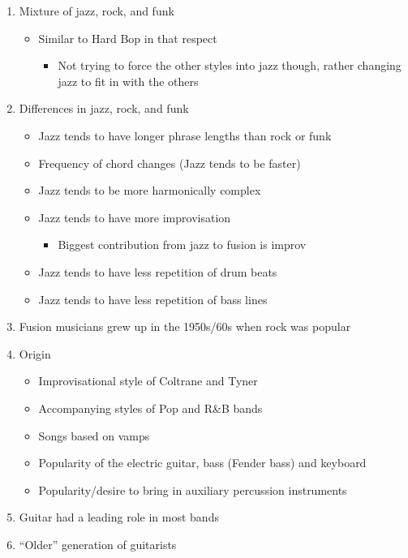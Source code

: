 \documentclass[]{article}
\providecommand{\tightlist}{%
  \setlength{\itemsep}{0pt}\setlength{\parskip}{0pt}}
\begin{document}
\begin{enumerate}
\def\labelenumi{\arabic{enumi}.}
\tightlist
\item
  Mixture of jazz, rock, and funk

  \begin{itemize}
  \tightlist
  \item
    Similar to Hard Bop in that respect

    \begin{itemize}
    \tightlist
    \item
      Not trying to force the other styles into jazz though, rather
      changing jazz to fit in with the others
    \end{itemize}
  \end{itemize}
\item
  Differences in jazz, rock, and funk

  \begin{itemize}
  \tightlist
  \item
    Jazz tends to have longer phrase lengths than rock or funk
  \item
    Frequency of chord changes (Jazz tends to be faster)
  \item
    Jazz tends to be more harmonically complex
  \item
    Jazz tends to have more improvisation

    \begin{itemize}
    \tightlist
    \item
      Biggest contribution from jazz to fusion is improv
    \end{itemize}
  \item
    Jazz tends to have less repetition of drum beats
  \item
    Jazz tends to have less repetition of bass lines
  \end{itemize}
\item
  Fusion musicians grew up in the 1950s/60s when rock was popular
\item
  Origin

  \begin{itemize}
  \tightlist
  \item
    Improvisational style of Coltrane and Tyner
  \item
    Accompanying styles of Pop and R\&B bands
  \item
    Songs based on vamps
  \item
    Popularity of the electric guitar, bass (Fender bass) and keyboard
  \item
    Popularity/desire to bring in auxiliary percussion instruments
  \end{itemize}
\item
  Guitar had a leading role in most bands
\item
  ``Older'' generation of guitarists


\end{enumerate}
\end{document}
